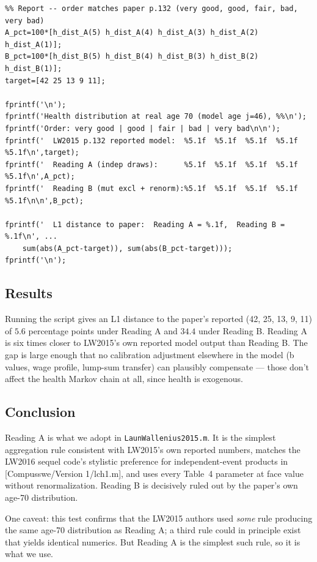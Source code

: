 \begin{small}
\begin{verbatim}
%% Report -- order matches paper p.132 (very good, good, fair, bad, very bad)
A_pct=100*[h_dist_A(5) h_dist_A(4) h_dist_A(3) h_dist_A(2) h_dist_A(1)];
B_pct=100*[h_dist_B(5) h_dist_B(4) h_dist_B(3) h_dist_B(2) h_dist_B(1)];
target=[42 25 13 9 11];

fprintf('\n');
fprintf('Health distribution at real age 70 (model age j=46), %%\n');
fprintf('Order: very good | good | fair | bad | very bad\n\n');
fprintf('  LW2015 p.132 reported model:  %5.1f  %5.1f  %5.1f  %5.1f  %5.1f\n',target);
fprintf('  Reading A (indep draws):      %5.1f  %5.1f  %5.1f  %5.1f  %5.1f\n',A_pct);
fprintf('  Reading B (mut excl + renorm):%5.1f  %5.1f  %5.1f  %5.1f  %5.1f\n\n',B_pct);

fprintf('  L1 distance to paper:  Reading A = %.1f,  Reading B = %.1f\n', ...
    sum(abs(A_pct-target)), sum(abs(B_pct-target)));
fprintf('\n');
\end{verbatim}
\end{small}

\subsection*{Results}

Running the script gives an L1 distance to the paper's reported (42, 25, 13, 9, 11) of $\mathbf{5.6}$ percentage points under Reading A and $\mathbf{34.4}$ under Reading B. Reading A is six times closer to LW2015's own reported model output than Reading B. The gap is large enough that no calibration adjustment elsewhere in the model (b values, wage profile, lump-sum transfer) can plausibly compensate --- those don't affect the health Markov chain at all, since health is exogenous.

\subsection*{Conclusion}

Reading A is what we adopt in \verb|LaunWallenius2015.m|. It is the simplest aggregation rule consistent with LW2015's own reported numbers, matches the LW2016 sequel code's stylistic preference for independent-event products in [Compusswe/Version 1/lch1.m], and uses every Table~4 parameter at face value without renormalization. Reading B is decisively ruled out by the paper's own age-70 distribution.

One caveat: this test confirms that the LW2015 authors used \emph{some} rule producing the same age-70 distribution as Reading A; a third rule could in principle exist that yields identical numerics. But Reading A is the simplest such rule, so it is what we use.
